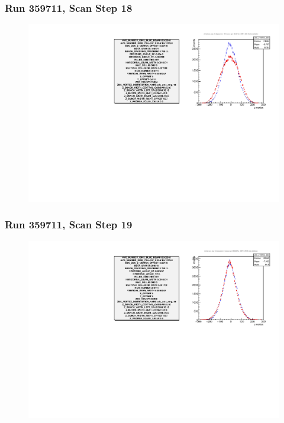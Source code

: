 \begin{frame}
\frametitle{Run 359711, Scan Step 18}
\begin{figure}
\begin{center}
\includegraphics[width=\linewidth]{"figures/359711_step_18_zdc_zvertex"}
\caption{ }
\label{fig:359711_step_18_zdc_zvertex}
\end{center}\end{figure}
\end{frame}

\begin{frame}
\frametitle{Run 359711, Scan Step 19}
\begin{figure}
\begin{center}
\includegraphics[width=\linewidth]{"figures/359711_step_19_zdc_zvertex"}
\caption{ }
\label{fig:359711_step_19_zdc_zvertex}
\end{center}\end{figure}
\end{frame}


